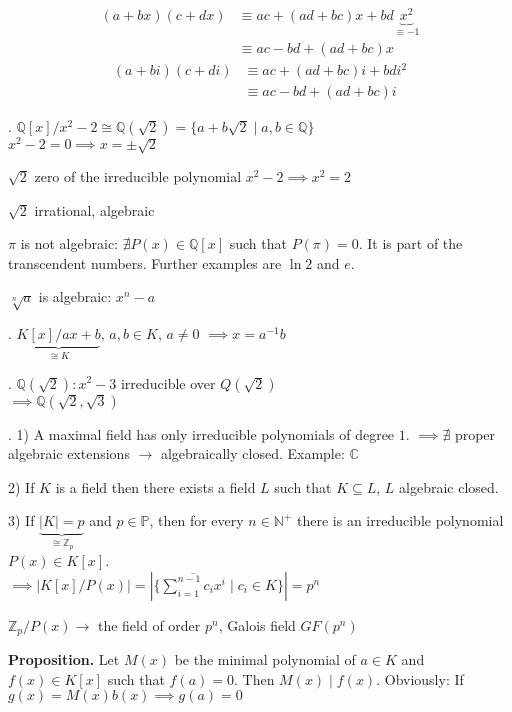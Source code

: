 \begin{align*}
  (a + bx)(c+dx)
  & \equiv ac + (ad+bc)x + bd \underbrace{x^2}_{\equiv -1} \\
  & \equiv ac - bd + (ad+bc)x
\end{align*}
\begin{align*}
  (a + bi)(c+di)
  & \equiv ac + (ad+bc)i + bd i^2 \\
  & \equiv ac - bd + (ad+bc)i
\end{align*}

\Example.
$\mathbb{Q}[x] / x^2 -2 \cong \mathbb{Q}(\sqrt{2}) = \{ a+b \sqrt{2} \mid a,b \in \mathbb{Q}\}$ \\
$x^2-2 = 0 \implies x = \pm \sqrt{2}$

$\sqrt{2}$ zero of the irreducible polynomial $x^2 -2 \implies x^2 = 2$

$\sqrt{2}$ irrational, algebraic

$\pi$ is not algebraic: $\nexists P(x) \in \mathbb{Q}[x]$ such that $P(\pi) = 0$. It is part of the transcendent numbers. Further examples are $\ln 2$ and $e$.

$\sqrt[n]{a}$ is algebraic: $x^n-a$

\Example.
$\underbrace{K[x]/ax+b}_{\cong K}$, $a,b \in K$, $ a\neq 0$ $\implies x = a^{-1}b$

\Example.
$\mathbb{Q}(\sqrt{2}): x^2 -3$ irreducible over $Q(\sqrt{2})$\\
$\implies \mathbb{Q}(\sqrt{2}, \sqrt{3})$

\Remark.
1) A maximal field has only irreducible polynomials of degree $1$. $\implies \nexists$ proper algebraic extensions $\rightarrow$ algebraically closed. Example: $\mathbb{C}$

2) If $K$ is a field then there exists a field $L$ such that $K \subseteq L$, $L$ algebraic closed.

3) If $\underbrace{|K| = p}_{\cong \mathbb{Z}_p}$ and $p\in \mathbb{P}$, then for every $n \in \mathbb{N}^{+}$ there is an irreducible polynomial $P(x) \in K[x]$. \\
$\implies \left| K[x]/P(x) \right| = \left| \{\overline{\sum_{i=1}^{n-1} c_i x^i} \mid c_i \in K\} \right| = p^n$

$\mathbb{Z}_p/P(x) \rightarrow$ the field of order $p^n$, Galois field $GF(p^n)$

\textbf{Proposition.}
Let $M(x)$ be the minimal polynomial of $a \in K$ and $f(x) \in K[x]$ such that $f(a) = 0$. Then $M(x)∣f(x)$. Obviously: If $g(x) = M(x)b(x) \implies g(a) = 0$

